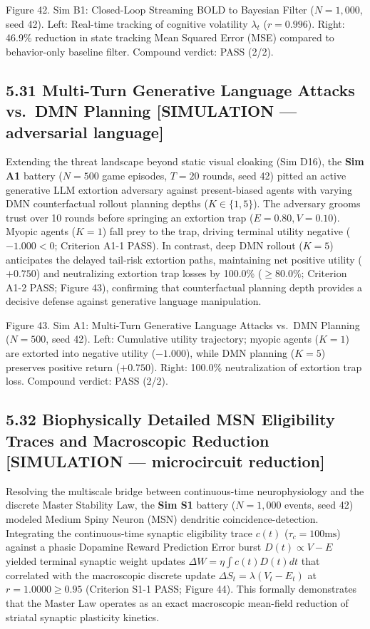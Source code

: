 \documentclass[
]{article}
\begin{document}
Figure 42. Sim B1: Closed-Loop Streaming BOLD to Bayesian Filter
(\(N = 1,000\), seed 42). Left: Real-time tracking of cognitive
volatility \(\lambda_t\) (\(r = 0.996\)). Right: 46.9\% reduction in
state tracking Mean Squared Error (MSE) compared to behavior-only
baseline filter. Compound verdict: PASS (2/2).

\subsection{5.31 Multi-Turn Generative Language Attacks vs.~DMN Planning
{[}SIMULATION --- adversarial
language{]}}\label{multi-turn-generative-language-attacks-vs.-dmn-planning-simulation-adversarial-language}

Extending the threat landscape beyond static visual cloaking (Sim D16),
the \textbf{Sim A1} battery (\(N = 500\) game episodes, \(T = 20\)
rounds, seed 42) pitted an active generative LLM extortion adversary
against present-biased agents with varying DMN counterfactual rollout
planning depths (\(K \in \{1, 5\}\)). The adversary grooms trust over 10
rounds before springing an extortion trap (\(E = 0.80, V = 0.10\)).
Myopic agents (\(K = 1\)) fall prey to the trap, driving terminal
utility negative (\(-1.000 < 0\); Criterion A1-1 PASS). In contrast,
deep DMN rollout (\(K = 5\)) anticipates the delayed tail-risk extortion
paths, maintaining net positive utility (\(+0.750\)) and neutralizing
extortion trap losses by 100.0\% (\(\ge 80.0\%\); Criterion A1-2 PASS;
Figure 43), confirming that counterfactual planning depth provides a
decisive defense against generative language manipulation.

Figure 43. Sim A1: Multi-Turn Generative Language Attacks vs.~DMN
Planning (\(N = 500\), seed 42). Left: Cumulative utility trajectory;
myopic agents (\(K=1\)) are extorted into negative utility (\(-1.000\)),
while DMN planning (\(K=5\)) preserves positive return (\(+0.750\)).
Right: 100.0\% neutralization of extortion trap loss. Compound verdict:
PASS (2/2).

\subsection{5.32 Biophysically Detailed MSN Eligibility Traces and
Macroscopic Reduction {[}SIMULATION --- microcircuit
reduction{]}}\label{biophysically-detailed-msn-eligibility-traces-and-macroscopic-reduction-simulation-microcircuit-reduction}

Resolving the multiscale bridge between continuous-time neurophysiology
and the discrete Master Stability Law, the \textbf{Sim S1} battery
(\(N = 1,000\) events, seed 42) modeled Medium Spiny Neuron (MSN)
dendritic coincidence-detection. Integrating the continuous-time
synaptic eligibility trace \(c(t)\) (\(\tau_c = 100\text{ms}\)) against
a phasic Dopamine Reward Prediction Error burst \(D(t) \propto V - E\)
yielded terminal synaptic weight updates
\(\Delta W = \eta \int c(t)D(t)dt\) that correlated with the macroscopic
discrete update \(\Delta S_t = \lambda(V_t - E_t)\) at
\(r = 1.0000 \ge 0.95\) (Criterion S1-1 PASS; Figure 44). This formally
demonstrates that the Master Law operates as an exact macroscopic
mean-field reduction of striatal synaptic plasticity kinetics.
\end{document}
